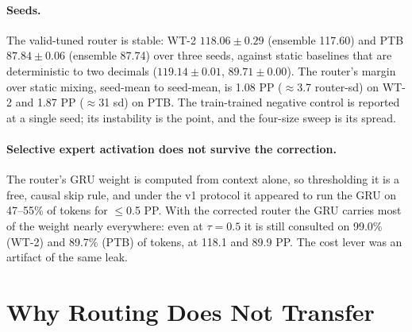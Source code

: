 \documentclass[11pt]{article}
\begin{document}
\paragraph{Seeds.} The valid-tuned router is stable: WT-2 $118.06\pm0.29$
(ensemble 117.60) and PTB $87.84\pm0.06$ (ensemble 87.74) over three seeds,
against static baselines that are deterministic to two decimals ($119.14\pm
0.01$, $89.71\pm0.00$). The router's margin over static mixing, seed-mean to seed-mean, is 1.08 PP
($\approx$3.7 router-sd) on WT-2 and 1.87 PP ($\approx$31 sd) on PTB. The train-trained negative
control is reported at a single seed; its instability is the point, and the
four-size sweep is its spread.

\paragraph{Selective expert activation does not survive the correction.} The
router's GRU weight is computed from context alone, so thresholding it is a
free, causal skip rule, and under the v1 protocol it appeared to run the GRU on
47--55\% of tokens for $\le$0.5 PP. With the corrected router the GRU carries
most of the weight nearly everywhere: even at $\tau=0.5$ it is still consulted
on 99.0\% (WT-2) and 89.7\% (PTB) of tokens, at 118.1 and 89.9 PP. The cost
lever was an artifact of the same leak.

\section{Why Routing Does Not Transfer}
\label{sec:why}
\end{document}
